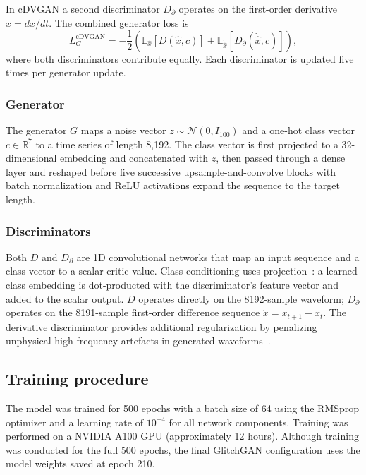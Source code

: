 \documentclass[reprint,nofootinbib,amsmath,amssymb,aps,floatfix]{revtex4-2}
\begin{document}
In cDVGAN a second discriminator $D_\partial$ operates on the first-order derivative $\dot{x} = dx/dt$.
The combined generator loss is
\begin{equation}\label{eq:combined_loss}
    L_G^{\text{cDVGAN}} = -\frac{1}{2}\left(\mathbb{E}_{\hat{x}}[D(\hat{x},c)] + \mathbb{E}_{\dot{\hat{x}}}[D_\partial(\dot{\hat{x}},c)]\right),
\end{equation}
where both discriminators contribute equally.
Each discriminator is updated five times per generator update.

\subsubsection{Generator}

The generator $G$ maps a noise vector $z \sim \mathcal{N}(0, I_{100})$ and a one-hot class vector $c \in \mathbb{R}^7$ to a time series of length 8,192.
The class vector is first projected to a 32-dimensional embedding and concatenated with $z$, then passed through a dense layer and reshaped before five successive upsample-and-convolve blocks with batch normalization and ReLU activations expand the sequence to the target length.

\subsubsection{Discriminators}

Both $D$ and $D_\partial$ are 1D convolutional networks that map an input sequence and a class vector to a scalar critic value.
Class conditioning uses projection~\cite{Mirza_2014}: a learned class embedding is dot-producted with the discriminator's feature vector and added to the scalar output.
$D$ operates directly on the 8192-sample waveform; $D_\partial$ operates on the 8191-sample first-order difference sequence $\dot{x} = x_{t+1} - x_t$.
The derivative discriminator provides additional regularization by penalizing unphysical high-frequency artefacts in generated waveforms~\cite{dooney2022dvgan}.

\subsection{Training procedure\label{sec:training_procedure}}

The model was trained for 500 epochs with a batch size of 64 using the RMSprop optimizer and a learning rate of $10^{-4}$ for all network components.
Training was performed on a NVIDIA A100 GPU (approximately 12 hours).
Although training was conducted for the full 500 epochs, the final GlitchGAN configuration uses the model weights saved at epoch 210.
\end{document}
